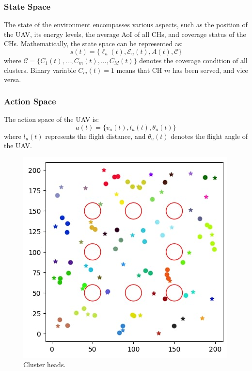 \documentclass[conference]{IEEEtran}
\begin{document}
\subsubsection{State Space}
The state of the environment encompasses various aspects, such as the position of the UAV, its energy levels, the average AoI of all CHs, and coverage status of the CHs. 
Mathematically, the state space can be represented as:
\begin{equation}
    s(t) = \{\ell_u(t), \mathcal{E}_u(t), A(t), \mathcal{C}\}
\end{equation}
where  $\mathcal{C} = \{C_1(t), \dots, C_m(t), \dots, C_M(t)\}$ denotes the coverage condition of all clusters. Binary variable $C_m(t) = 1$ means that CH $m$ has been served, and vice versa.
\subsubsection{Action Space}
The action space of the UAV is:
\begin{equation}
    a(t) = \{v_u(t), l_u(t), \theta_u(t)\}
\end{equation}
where $l_u(t)$ represents the flight distance, and $\theta_u(t)$ denotes the flight angle of the UAV. 
\begin{figure}[htbp]
\centerline{\includegraphics[width=1\columnwidth]{Clustering.png}}
\caption{Cluster heads.}
\label{p1}
\end{figure}
\end{document}
